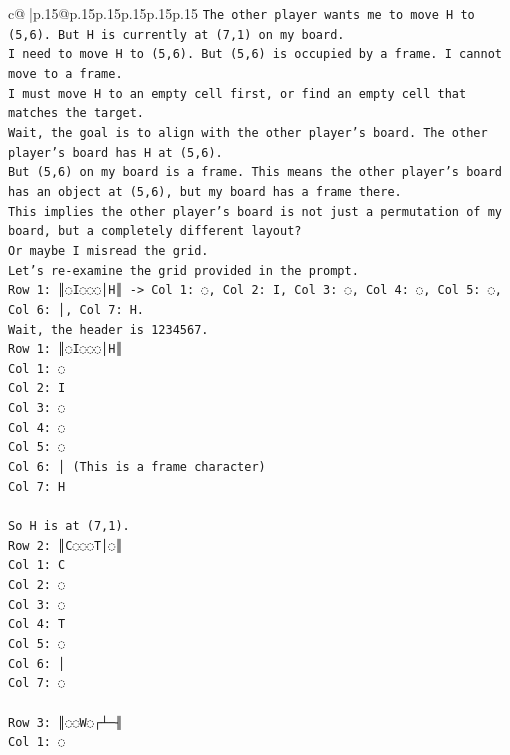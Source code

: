 \documentclass{article}
\begin{document}
{\begin{supertabular}{c@{$\;$}|p{.15\linewidth}@{}p{.15\linewidth}p{.15\linewidth}p{.15\linewidth}p{.15\linewidth}p{.15\linewidth}}
{{{\texttt{The other player wants me to move H to (5,6). But H is currently at (7,1) on my board.} \\
\texttt{I need to move H to (5,6). But (5,6) is occupied by a frame. I cannot move to a frame.} \\
\texttt{I must move H to an empty cell first, or find an empty cell that matches the target.} \\
\texttt{Wait, the goal is to align with the other player's board. The other player's board has H at (5,6).} \\
\texttt{But (5,6) on my board is a frame. This means the other player's board has an object at (5,6), but my board has a frame there.} \\
\texttt{This implies the other player's board is not just a permutation of my board, but a completely different layout?} \\
\texttt{Or maybe I misread the grid.} \\
\texttt{Let's re{-}examine the grid provided in the prompt.} \\
\texttt{Row 1: ║◌I◌◌◌│H║ {-}> Col 1: ◌, Col 2: I, Col 3: ◌, Col 4: ◌, Col 5: ◌, Col 6: │, Col 7: H.} \\
\texttt{Wait, the header is 1234567.} \\
\texttt{Row 1: ║◌I◌◌◌│H║} \\
\texttt{Col 1: ◌} \\
\texttt{Col 2: I} \\
\texttt{Col 3: ◌} \\
\texttt{Col 4: ◌} \\
\texttt{Col 5: ◌} \\
\texttt{Col 6: │ (This is a frame character)} \\
\texttt{Col 7: H} \\
\\ 
\texttt{So H is at (7,1).} \\
\texttt{Row 2: ║C◌◌◌T│◌║} \\
\texttt{Col 1: C} \\
\texttt{Col 2: ◌} \\
\texttt{Col 3: ◌} \\
\texttt{Col 4: T} \\
\texttt{Col 5: ◌} \\
\texttt{Col 6: │} \\
\texttt{Col 7: ◌} \\
\\ 
\texttt{Row 3: ║◌◌W◌┌┴─╢} \\
\texttt{Col 1: ◌} \\
}}}
\end{supertabular}}
\end{document}
